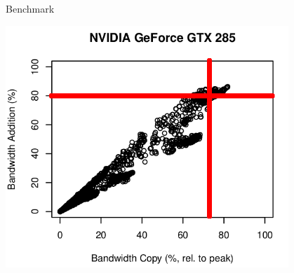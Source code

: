 \begin{frame}{Benchmark}
  \begin{center} \includegraphics[width=0.8\textwidth]{figures/gtx285-addition-copy-3} \end{center}
\end{frame}


